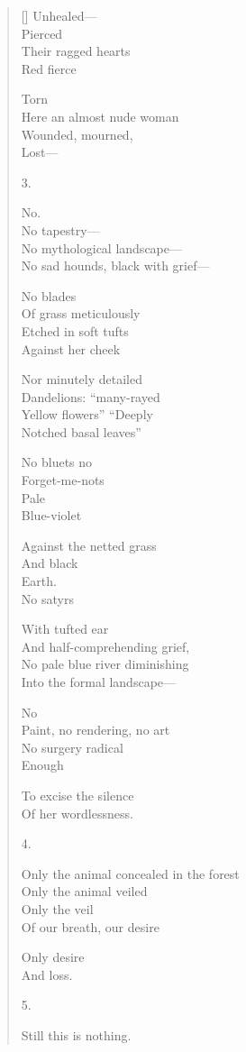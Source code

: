 \begin{verse}[\versewidth]
Unhealed---\\
Pierced\\
Their ragged hearts\\
Red   fierce

Torn\\
Here an almost nude woman\\
Wounded, mourned, \\
Lost---

3.

No.\\
No tapestry---\\
No mythological landscape---\\
No sad hounds, black with grief---

No blades\\
Of grass meticulously\\
Etched in soft tufts \\
Against her cheek

Nor minutely detailed\\
Dandelions: ``many-rayed\\
Yellow flowers'' ``Deeply\\
Notched basal leaves''

No bluets   no\\
Forget-me-nots\\
Pale\\
Blue-violet

Against the netted grass\\
And black\\
Earth.\\
No satyrs

With tufted ear\\
And half-comprehending grief,\\
No pale blue river diminishing\\
Into the formal landscape---

No\\
Paint, no rendering, no art\\
No surgery radical\\
Enough

To excise the silence\\
Of her wordlessness.

4.

Only the animal concealed in the forest\\
Only the animal veiled\\
Only the veil\\
Of our breath, our desire

Only desire\\
And loss.

5.

Still this is nothing. 
\end{verse}
